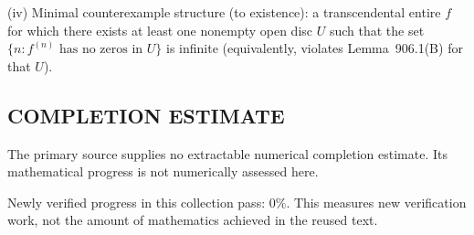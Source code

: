 (iv) Minimal counterexample structure (to existence): a transcendental entire $f$ for which there exists at least one nonempty open disc $U$ such that the set $\{n: f^{(n)}\text{ has no zeros in }U\}$ is infinite (equivalently, violates Lemma~906.1(B) for that $U$).




\subsection*{COMPLETION ESTIMATE}
The primary source supplies no extractable numerical completion estimate. Its mathematical progress is not numerically assessed here.

Newly verified progress in this collection pass: $0\%$. This measures new verification work, not the amount of mathematics achieved in the reused text.
